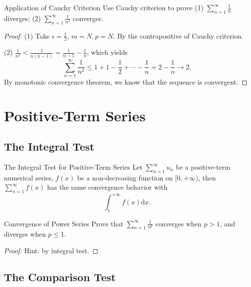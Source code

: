 \begin{example}{Application of Cauchy Criterion}{}
  Use Cauchy criterion to prove
  (1) $\sum\limits_{n = 1}^{\infty}\frac{1}{n}$ diverges;
  (2) $\sum\limits_{n = 1}^{\infty} \frac{1}{n^2}$ converges.
\end{example}

\begin{proof}
  (1) Take $\epsilon = \frac{1}{2}$, $m = N, p = N$.
  By the contrapositive of Cauchy criterion.

  (2) $\frac{1}{n^2} < \frac{1}{n(n-1)} = \frac{1}{n-1} - \frac{1}{n}$,
  which yields
  \begin{equation}
    \sum\limits_{n = 1}^{\infty} \frac{1}{n^2}
    \leq 1 + 1 - \frac{1}{2} + \cdots - \frac{1}{n} = 2 - \frac{1}{n} \rightarrow 2.
  \end{equation}
  By monotonic convergence theorem, we know that the sequence is convergent.
\end{proof}

\section{Positive-Term Series}

\subsection{The Integral Test}

\begin{theorem}{The Integral Test for Positive-Term Series}{}
  Let $\sum\limits_{n = 1}^{\infty}u_n$ be a positive-term numerical series,
  $f(x)$ be a non-decreasing function on $[0, +\infty)$,
  then $\sum\limits_{n = 1}^{\infty} f(x)$ has the same convergence behavior with
  \begin{equation}
    \int_1^{+\infty} f(x) \mathrm{d} x.
  \end{equation}
\end{theorem}

\begin{example}{Convergence of Power Series}{}
  Prove that $\sum\limits_{n = 1}^{\infty} \frac{1}{n^p}$ converges when $p >
  1$,
  and diverges when $p \leq 1$.
\end{example}

\begin{proof}
  Hint: by integral test.
\end{proof}

\subsection{The Comparison Test}

